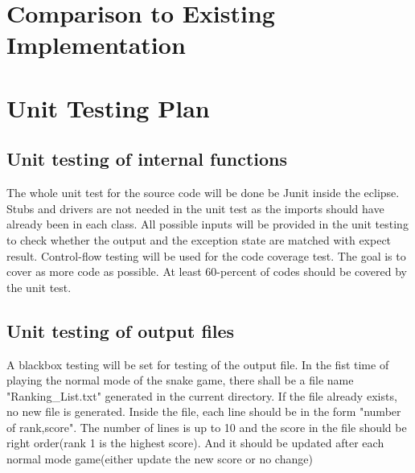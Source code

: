 \documentclass[12pt, titlepage]{article}
\begin{document}

	
\section{Comparison to Existing Implementation}	
				
\section{Unit Testing Plan}

\subsection{Unit testing of internal functions}
The whole unit test for the source code will be done be Junit inside the eclipse. Stubs and drivers are not needed in the unit test as the imports should have already been in each class. All possible inputs will be provided in the unit testing to check whether the output and the exception state are matched with expect result. Control-flow testing will be used for the code coverage test. The goal is to cover as more code as possible. At least 60-percent of codes should be covered by the unit test.

\subsection{Unit testing of output files}		
A blackbox testing will be set for testing of the output file. In the fist time of playing the normal mode of the snake game, there shall be a file name "Ranking\_List.txt" generated in the current directory. If the file already exists, no new file is generated. Inside the file, each line should be in the form "number of rank,score".
    The number of lines is up to 10 and the score in the file should be right order(rank 1 is the highest score). And it should be updated after each normal mode game(either update the new score or no change)







\newpage
\end{document}
